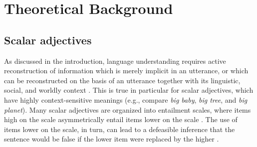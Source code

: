 \documentclass[10pt]{article}
\begin{document}
 
%

\section{Theoretical Background}
\vspace{-.2mm}
\subsection{\label{scalar-theory}Scalar adjectives}
\vspace{-.15mm}
As discussed in the introduction, language understanding requires active reconstruction of information which is merely implicit in an utterance, or which can be reconstructed on the basis of an utterance together with its linguistic, social, and worldly context \cite{grice1975logic,hobbs1993interpretation,clark1996using,hanna2003effects,piantadosi2012communicative}.
%
%
%
This is true in particular for scalar adjectives, which have highly context-sensitive meanings (e.g., compare \emph{big baby}, \emph{big tree}, and \emph{big planet}). Many scalar adjectives are organized into entailment scales, where items high on the scale asymmetrically entail items lower on the scale \cite{horn89,horn2000pick}. The use of items lower on the scale, in turn, can lead to a defeasible inference that the sentence would be false if the lower item were replaced by the higher \cite{grice1975logic,horn89}.
 \vspace{-.05in} 
\end{document}
